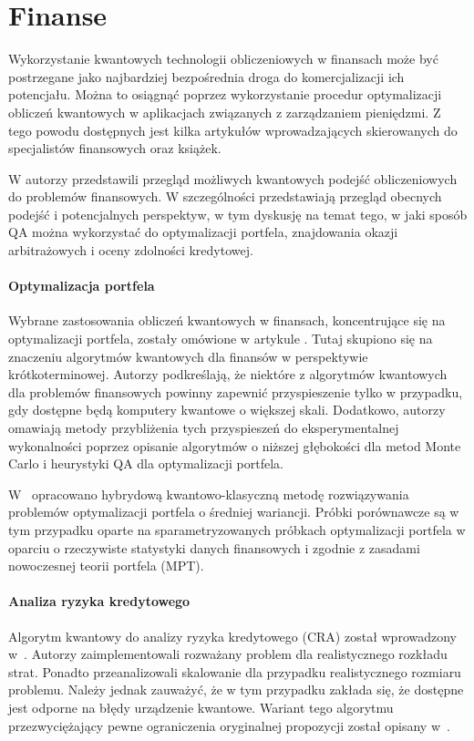 \documentclass[a4paper,11pt]{article}
\begin{document}
\section{Finanse}


Wykorzystanie kwantowych technologii obliczeniowych w finansach może być postrzegane jako najbardziej bezpośrednia droga do komercjalizacji ich potencjału. Można to osiągnąć poprzez wykorzystanie procedur optymalizacji obliczeń kwantowych w aplikacjach związanych z zarządzaniem pieniędzmi. Z tego powodu dostępnych jest kilka artykułów wprowadzających skierowanych do specjalistów finansowych oraz książek.

W \cite{orus2019quantum} autorzy przedstawili przegląd możliwych kwantowych podejść obliczeniowych do problemów finansowych. W szczególności przedstawiają przegląd obecnych podejść i potencjalnych perspektyw, w tym dyskusję na temat tego, w jaki sposób QA można wykorzystać do optymalizacji portfela, znajdowania okazji arbitrażowych i oceny zdolności kredytowej.

\paragraph{Optymalizacja portfela}
Wybrane zastosowania obliczeń kwantowych w finansach, koncentrujące się na optymalizacji portfela, zostały omówione w artykule \cite{bouland2020prospects}. Tutaj skupiono się na znaczeniu algorytmów kwantowych dla finansów w perspektywie krótkoterminowej. Autorzy podkreślają, że niektóre z algorytmów kwantowych dla problemów finansowych powinny zapewnić przyspieszenie tylko w przypadku, gdy dostępne będą komputery kwantowe o większej skali. Dodatkowo, autorzy omawiają metody przybliżenia tych przyspieszeń do eksperymentalnej wykonalności poprzez opisanie algorytmów o niższej głębokości dla metod Monte Carlo i heurystyki QA dla optymalizacji portfela.

W~\cite{venturelli2019reverse} opracowano hybrydową kwantowo-klasyczną metodę rozwiązywania problemów optymalizacji portfela o średniej wariancji. Próbki porównawcze są w tym przypadku oparte na sparametryzowanych próbkach optymalizacji portfela w oparciu o rzeczywiste statystyki danych finansowych i zgodnie z zasadami nowoczesnej teorii portfela (MPT).

\paragraph {Analiza ryzyka kredytowego}
Algorytm kwantowy do analizy ryzyka kredytowego (CRA) został wprowadzony w~\cite{egger2021credit}. Autorzy zaimplementowali rozważany problem dla realistycznego rozkładu strat. Ponadto przeanalizowali skalowanie dla przypadku realistycznego rozmiaru problemu. Należy jednak zauważyć, że w tym przypadku zakłada się, że dostępne jest odporne na błędy urządzenie kwantowe. Wariant tego algorytmu przezwyciężający pewne ograniczenia oryginalnej propozycji został opisany w~\cite{dri2022towards,dri2023more}.
\end{document}
